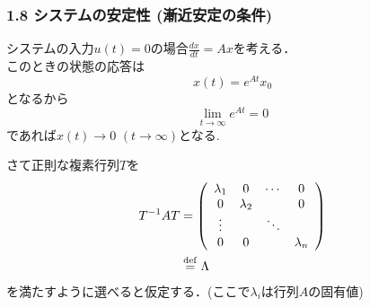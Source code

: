 \begin{frame}[t]
\frametitle{1.8 システムの安定性 (漸近安定の条件)}

システムの入力$u(t)=0$の場合$\frac{dx}{dt} = Ax$を考える．\\
このときの状態の応答は
\begin{equation}
 x(t) = e^{At} x_0
\end{equation}
となるから
\begin{equation}
 \lim_{t \rightarrow \infty} e^{At} = 0
\end{equation}
であれば$x(t) \rightarrow 0$ $(t \rightarrow \infty)$となる.

さて正則な複素行列$T$を
\begin{align}
 T^{-1} A T
  &=
  \left(\begin{array}{cccc}
         \lambda_1 & 0         & \cdots & 0 \\
   0         & \lambda_2 &        & 0 \\
   \vdots    &           & \ddots & \\
   0         & 0         &        & \lambda_n
  \end{array}\right) \nonumber \\
 &\stackrel{\rm def}{=} \Lambda
\end{align}
を満たすように選べると仮定する．(ここで$\lambda_i$は行列$A$の固有値)
\end{frame}


